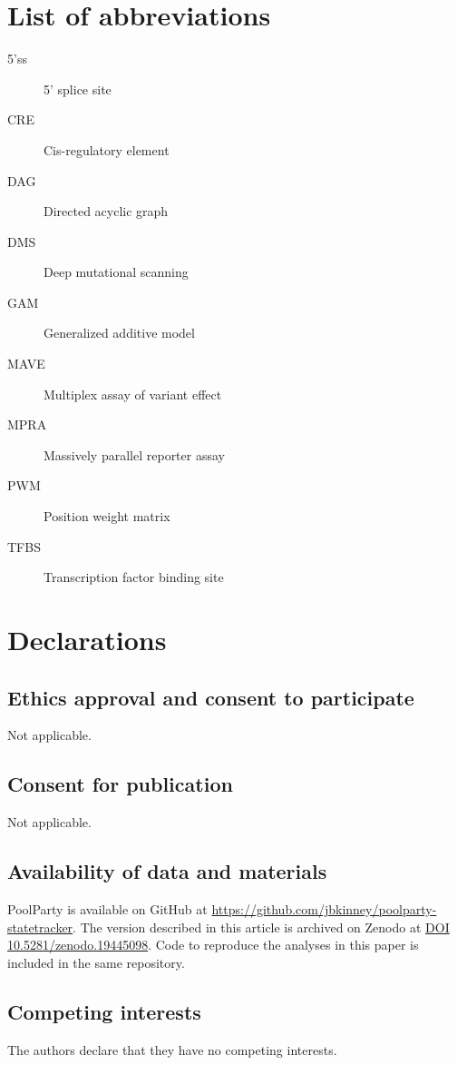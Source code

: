 \documentclass[pdflatex,sn-vancouver-num,referee,lineno,oneside]{sn-jnl}
\begin{document}
\section*{List of abbreviations}
\begin{description}
  \item[5'ss] 5' splice site
  \item[CRE] Cis-regulatory element
  \item[DAG] Directed acyclic graph
  \item[DMS] Deep mutational scanning
  \item[GAM] Generalized additive model
  \item[MAVE] Multiplex assay of variant effect
  \item[MPRA] Massively parallel reporter assay
  \item[PWM] Position weight matrix
  \item[TFBS] Transcription factor binding site
\end{description}

\section*{Declarations}

\subsection*{Ethics approval and consent to participate}
Not applicable.

\subsection*{Consent for publication}
Not applicable.

\subsection*{Availability of data and materials}
PoolParty is available on GitHub at \url{https://github.com/jbkinney/poolparty-statetracker}. The version described in this article is archived on Zenodo at \href{https://zenodo.org/records/19445098}{DOI 10.5281/zenodo.19445098}. Code to reproduce the analyses in this paper is included in the same repository.

\subsection*{Competing interests}
The authors declare that they have no competing interests.
\end{document}
